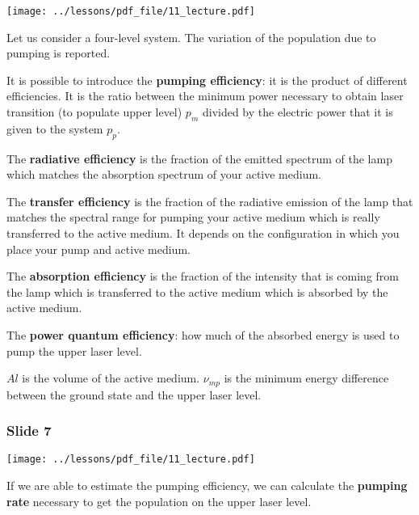\documentclass[../main/main.tex]{subfiles}
\begin{document}
\begin{minipage}[]{0.5\linewidth}
\centering
\texttt{[image: ../lessons/pdf\_file/11\_lecture.pdf]}
\end{minipage}
\hspace{0.3cm}\vspace{0.3cm}
\begin{minipage}[c]{0.47\linewidth}

Let us consider a four-level system.
The variation of the population due to pumping is reported.

It is possible to introduce the \textbf{pumping efficiency}: it is the product of different efficiencies. It is the ratio between the minimum power necessary to obtain laser transition (to populate upper level) \( p_m \) divided by the electric power that it is given to the system \( p_p \).

The \textbf{radiative efficiency} is the fraction of the emitted spectrum of the lamp which matches the absorption spectrum of your active medium.

The \textbf{transfer efficiency} is the fraction of the radiative emission of the lamp that matches the spectral range for pumping your active medium which is really transferred to the active medium. It depends on the configuration in which you place your pump and active medium.

\end{minipage}

The \textbf{absorption efficiency} is the fraction of the intensity that is coming from the lamp which is transferred to the active medium which is absorbed by the active medium.

The \textbf{power quantum efficiency}: how much of the absorbed energy is used to pump the upper laser level.

\( A l \)  is the volume of the active medium. \( \nu _{mp} \) is the minimum energy difference between the ground state and the upper laser level.

\newpage

\subsubsection*{Slide 7}

\begin{minipage}[]{0.5\linewidth}
\centering
\texttt{[image: ../lessons/pdf\_file/11\_lecture.pdf]}
\end{minipage}
\hspace{0.3cm}\vspace{0.3cm}
\begin{minipage}[c]{0.47\linewidth}

If we are able to estimate the pumping efficiency, we can calculate the \textbf{pumping rate} necessary to get the population on the upper laser level.

\end{minipage}
\end{document}
